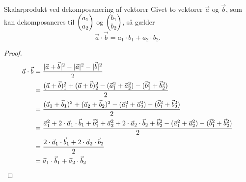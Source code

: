 \documentclass{article}
\begin{document}
\begin{theorem}{Skalarprodukt ved dekomposanering af vektorer}{}
	Givet to vektorer $\vec{a}$ og $\vec{b}$, som kan dekomposaneres til $ \begin{pmatrix} a_1\\ a_2 \end{pmatrix} $ og $ \begin{pmatrix} b_1\\ b_2 \end{pmatrix} $, så gælder
	\[
		\vec{a} \cdot \vec{b} = a_1 \cdot b_1 + a_2 \cdot b_2.
	\] 
\end{theorem}

\begin{proof}
\begin{align*}
	\vec{a} \cdot \vec{b} &= \frac{|\vec{a} + \vec{b}|^2 - |\vec{a}|^2 - |\vec{b}|^2}{2}\\
						  &= \frac{(\vec{a} + \vec{b})_1^2 + (\vec{a} + \vec{b})_2^2 - (\vec{a}_1^2 + \vec{a}_2^2) - (\vec{b}_1^2 + \vec{b}_2^2)}{2}\\
						  &= \frac{(\vec{a}_1 + \vec{b}_1)^2 + (\vec{a}_2 + \vec{b}_2)^2 - (\vec{a}_1^2 + \vec{a}_2^2) - (\vec{b}_1^2 + \vec{b}_2^2)}{2}\\
						  &= \frac{\vec{a}_1^2 + 2 \cdot \vec{a}_1 \cdot \vec{b}_1 + \vec{b}_1^2 + \vec{a}_2^2 + 2 \cdot \vec{a}_2 \cdot \vec{b}_2 + \vec{b}_2^2 - (\vec{a}_1^2 + \vec{a}_2^2) - (\vec{b}_1^2 + \vec{b}_2^2)}{2}\\
						  &= \frac{2 \cdot \vec{a}_1 \cdot \vec{b}_1 + 2 \cdot \vec{a}_2 \cdot \vec{b}_2}{2}\\
						  &= \vec{a}_1 \cdot \vec{b}_1 + \vec{a}_2 \cdot \vec{b}_2\qedhere
\end{align*}
\end{proof}
\end{document}
